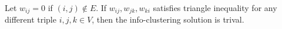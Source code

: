 \begin{proposition}
Let $w_{ij}=0$ if $(i,j)\not\in E$. If $w_{ij}, w_{jk}, w_{ki}$ satisfies triangle inequality for any different triple $i, j, k \in V$, then the info-clustering solution is trival.
\end{proposition}
